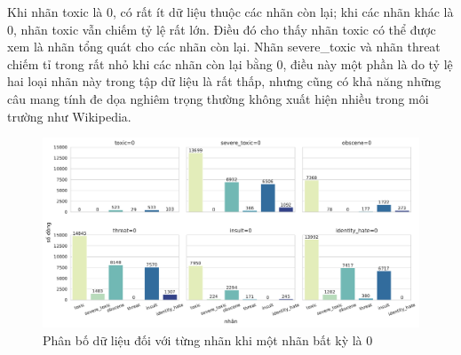 Khi nhãn toxic là $0$, có rất ít dữ liệu thuộc các nhãn còn lại; khi các nhãn khác là $0$, nhãn toxic vẫn chiếm tỷ lệ rất lớn. Điều đó cho thấy nhãn toxic có thể được xem là nhãn tổng quát cho các nhãn còn lại. Nhãn severe\_toxic và nhãn threat chiếm tỉ trong rất nhỏ khi các nhãn còn lại bằng $0$, điều này một phần là do tỷ lệ hai loại nhãn này trong tập dữ liệu là rất thấp, nhưng cũng có khả năng những câu mang tính đe dọa nghiêm trọng thường không xuất hiện nhiều trong môi trường như Wikipedia.
\begin{figure}[htb]
    \centering
    \includegraphics[width=\textwidth]{chapter_2/image/num_records_per_label_without_one_label.pdf}
    \caption{Phân bố dữ liệu đối với từng nhãn khi một nhãn bất kỳ là $0$}
\end{figure}

\clearpage
